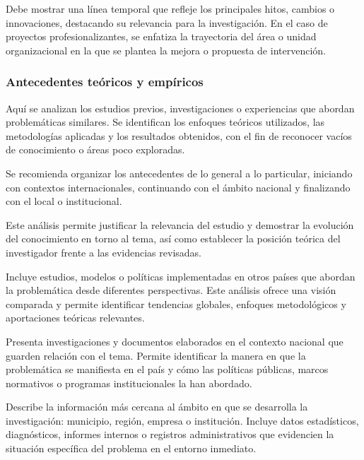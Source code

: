 Debe mostrar una línea temporal que refleje los principales hitos, cambios o innovaciones, destacando su relevancia para la investigación. En el caso de proyectos profesionalizantes, se enfatiza la trayectoria del área o unidad organizacional en la que se plantea la mejora o propuesta de intervención.

\subsubsection{Antecedentes teóricos y empíricos}

Aquí se analizan los estudios previos, investigaciones o experiencias que abordan problemáticas similares. Se identifican los enfoques teóricos utilizados, las metodologías aplicadas y los resultados obtenidos, con el fin de reconocer vacíos de conocimiento o áreas poco exploradas.

Se recomienda organizar los antecedentes de lo general a lo particular, iniciando con contextos internacionales, continuando con el ámbito nacional y finalizando con el local o institucional.

Este análisis permite justificar la relevancia del estudio y demostrar la evolución del conocimiento en torno al tema, así como establecer la posición teórica del investigador frente a las evidencias revisadas.


Incluye estudios, modelos o políticas implementadas en otros países que abordan la problemática desde diferentes perspectivas. Este análisis ofrece una visión comparada y permite identificar tendencias globales, enfoques metodológicos y aportaciones teóricas relevantes.


Presenta investigaciones y documentos elaborados en el contexto nacional que guarden relación con el tema. Permite identificar la manera en que la problemática se manifiesta en el país y cómo las políticas públicas, marcos normativos o programas institucionales la han abordado.


Describe la información más cercana al ámbito en que se desarrolla la investigación: municipio, región, empresa o institución. Incluye datos estadísticos, diagnósticos, informes internos o registros administrativos que evidencien la situación específica del problema en el entorno inmediato.

